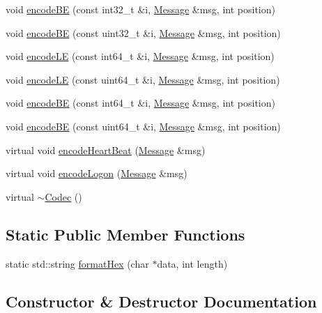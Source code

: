 \begin{DoxyCompactItemize}
void \hyperlink{classMetal_1_1Codec_a30d84ca7c8a95a10103555b0364d3c0b}{encode\+B\+E} (const int32\+\_\+t \&i, \hyperlink{classMetal_1_1Message}{Message} \&msg, int position)
\item 
void \hyperlink{classMetal_1_1Codec_aa721fe0d642e0a6f127a2c1fc7410293}{encode\+B\+E} (const uint32\+\_\+t \&i, \hyperlink{classMetal_1_1Message}{Message} \&msg, int position)
\item 
void \hyperlink{classMetal_1_1Codec_a32a01360f4aff4c57a7c54c72e1e8a27}{encode\+L\+E} (const int64\+\_\+t \&i, \hyperlink{classMetal_1_1Message}{Message} \&msg, int position)
\item 
void \hyperlink{classMetal_1_1Codec_acbe0a9a61a63cbfc4373b1e72603a70f}{encode\+L\+E} (const uint64\+\_\+t \&i, \hyperlink{classMetal_1_1Message}{Message} \&msg, int position)
\item 
void \hyperlink{classMetal_1_1Codec_afd8c4138467dd3e593e17fe2cbd41a01}{encode\+B\+E} (const int64\+\_\+t \&i, \hyperlink{classMetal_1_1Message}{Message} \&msg, int position)
\item 
void \hyperlink{classMetal_1_1Codec_ae8e4c0fcd43cb06917f833f66e59b413}{encode\+B\+E} (const uint64\+\_\+t \&i, \hyperlink{classMetal_1_1Message}{Message} \&msg, int position)
\item 
virtual void \hyperlink{classMetal_1_1Codec_ae4796fc3d128fa650e28acdfe4277bd7}{encode\+Heart\+Beat} (\hyperlink{classMetal_1_1Message}{Message} \&msg)
\item 
virtual void \hyperlink{classMetal_1_1Codec_a14c3cc3c624726297171e843da71fa83}{encode\+Logon} (\hyperlink{classMetal_1_1Message}{Message} \&msg)
\item 
virtual \hyperlink{classMetal_1_1Codec_a68847484c9c80e04e4e4e5592cf113db}{$\sim$\+Codec} ()
\end{DoxyCompactItemize}
\subsection*{Static Public Member Functions}
\begin{DoxyCompactItemize}
\item 
static std\+::string \hyperlink{classMetal_1_1Codec_afe39c79b73724a05feea4c06a59b4d53}{format\+Hex} (char $\ast$data, int length)
\end{DoxyCompactItemize}


\subsection{Constructor \& Destructor Documentation}
\hypertarget{classMetal_1_1Codec_a439fd8e827fabe656f49a7a043ab98d0}{}
